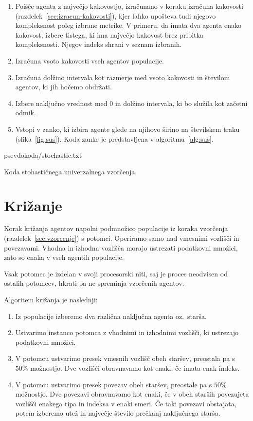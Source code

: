 \documentclass[a4paper,12pt,openright]{book}
\newcommand{\lstlistingslo}{}
\begin{document}
    \begin{enumerate}
        \item Poišče agenta z največjo kakovostjo, izračunano v koraku izračuna kakovosti (razdelek~\ref{sec:izracun-kakovosti}), kjer
        lahko upošteva tudi njegovo kompleksnost poleg izbrane metrike.
        V primeru, da imata dva agenta enako kakovost, izbere tistega, ki ima največjo kakovost brez pribitka kompleksnosti.
        Njegov indeks shrani v seznam izbranih.
        \item Izračuna vsoto kakovosti vseh agentov populacije.
        \item Izračuna dolžino intervala kot razmerje med vsoto kakovosti in številom agentov, ki jih hočemo obdržati.
        \item Izbere naključno vrednost med 0 in dolžino intervala, ki bo služila kot začetni odmik.
        \item Vstopi v zanko, ki izbira agente glede na njihovo širino na številskem traku (slika~\ref{fig:sus}).
        Koda zanke je predstavljena v algoritmu~\ref{alg:sus}.
    \end{enumerate}

    \begin{algorithm}[H]
        \lstlistingslo{psevdokoda/stochastic.txt}
        \caption{Koda stohastičnega univerzalnega vzorčenja.}
        \label{alg:sus}
    \end{algorithm}


    \section{Križanje}\label{sec:krizanje}
    Korak križanja agentov napolni podmnožico populacije iz koraka vzorčenja (razdelek~\ref{sec:vzorcenje}) s potomci.
    Operiramo samo nad vmesnimi vozlišči in povezavami.
    Vhodna in izhodna vozlišča morajo ustrezati podatkovni množici, zato so enaka v vseh agentih populacije.

    Vsak potomec je izdelan v svoji procesorski niti, saj je proces neodvisen od ostalih potomcev, hkrati pa ne
    spreminja vzorčenih agentov.

    Algoritem križanja je naslednji:
    \begin{enumerate}
        \item Iz populacije izberemo dva različna naključna agenta oz.\ starša.
        \item Ustvarimo instanco potomca z vhodnimi in izhodnimi vozlišči, ki ustrezajo podatkovni množici.
        \item V potomcu ustvarimo presek vmesnih vozlišč obeh staršev, preostala pa s $50\%$ možnostjo.
        Dve vozlišči obravnavamo kot enaki, če imata enak indeks.
        \item V potomcu ustvarimo presek povezav obeh staršev, preostale pa s $50\%$ možnostjo.
        Dve povezavi obravnavamo kot enaki, če v obeh starših povezujeta vozlišči enakega tipa in indeksa v enaki smeri.
        Če taki povezavi obstajata, potem izberemo utež in največje število prečkanj naključnega starša.
    \end{enumerate}
\end{document}
